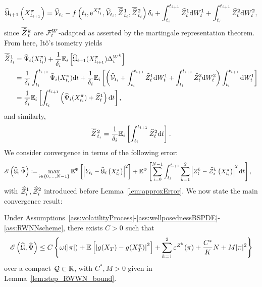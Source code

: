 \begin{equation}\label{eq:martingaleRep}
    \widehat{\mathfrak{U}}_{i+1}\left(X^\pi_{t_{i+1}}\right)=\widehat{\mathcal{V}}_{t_{i}}-f\left(t_{i},\mathrm{e}^{X^\pi_{t_{i}}}, \widehat{\mathcal{V}}_{t_{i}}, \overline{\widehat{Z}}\kern0.1em^{1}_{t_{i}}, \overline{\widehat{Z}}\kern0.1em^{2}_{t_{i}}\right) \delta_{i} +\int_{t_{i}}^{t_{i+1}}{\widehat{Z}}_{t}^1\mathrm{d} W^1_{t}+\int_{t_{i}}^{t_{i+1}} {\widehat{Z}}_{t}^2 \mathrm{d} W^2_{t},
\end{equation}
since $\overline{\widehat{Z}}\kern0.1em^{k}_{t}$ are $\mathcal{F}_t^W$-adapted as asserted by the martingale representation theorem. 
From here, It\^o's isometry yields
\begin{align*}
    \overline{\widehat{Z}}\kern0.1em^{1}_{t_{i}} &= \widehat\Psi_i(X^\pi_{t_i}) +  \frac1{\delta_{i}}\mathbb{E}_i\left[\widehat{\mathfrak{U}}_{i+1}(X^\pi_{t_{i+1}})\Delta^{W^k}_{i} \right] \\
    &= \frac1{\delta_{i}}\int_{t_i}^{t_{i+1}}\widehat\Psi_i(X^\pi_{t_i})\mathrm{d} t +  \frac1{\delta_{i}}\mathbb{E}_i\left[\left(\widehat{\mathcal{V}}_{t_i} +\int_{t_{i}}^{t_{i+1}} \widehat{Z}_{t}^1 \mathrm{d} W^1_{t}+\int_{t_{i}}^{t_{i+1}} \widehat{Z}_{t}^2 \mathrm{d} W^2_{t} \right)\int_{t_i}^{t_{i+1}} \mathrm{d} W^1_t \right]  \\
    &= \frac1{\delta_{i}}\mathbb{E}_i\left[\int_{t_i}^{t_{i+1}}\left( \widehat\Psi_i(X^\pi_{t_i}) + \widehat{Z}_{t}^1 \right)\mathrm{d} t \right],
\end{align*}
and similarly, 
$$
\overline{\widehat{Z}}\kern0.1em^{2}_{t_{i}} = \frac1{\delta_{i}}\mathbb{E}_i\left[\int_{t_i}^{t_{i+1}} \widehat{Z}_{t}^2 \mathrm{d} t \right].
$$
We consider convergence in terms of the following error:
\[
\begin{aligned}
\mathscr{E}\left(\widehat{\mathfrak{U}}, \widehat\Psi\right) \coloneqq &\max _{i\in\{0, \dots, N-1\}} \mathbb{E}^\Phi\left[\left|Y_{t_i}-\widehat{\mathfrak{U}}_i\left(X^\pi_{t_i}\right)\right|^2\right]+\mathbb{E}^\Phi\left[\sum_{i=0}^{N-1} \int_{t_i}^{t_{i+1}}\sum_{k=1}^2\left|Z_t^k-\widehat{\mathcal{Z}}^k_i\left(X^\pi_{t_i}\right)\right|^2 \mathrm{d} t\right],
\end{aligned}
\]
with $\widehat{\mathcal{Z}}^1_{i}, \widehat{\mathcal{Z}}^2_{i}$
introduced before Lemma~\ref{lem:approxError}. 
We now state the main convergence result:
\begin{theorem}\label{thm:convergence}
Under Assumptions~\ref{ass:volatilityProcess}-\ref{ass:wellposednessBSPDE}-\ref{ass:RWNNscheme},
there exists $C>0$ such that
\[
\mathscr{E}\left(\widehat{\mathfrak{U}}, \widehat\Psi\right) \leq C\left\{\omega(|\pi|) + \mathbb{E}\left[\left|g(X_T)-g(X^{\pi}_{T})\right|^2\right]+\sum_{k=1}^2\varepsilon^{Z^k}(\pi)+\frac{C^{*}}{K}N+ M|\pi|^2\right\}  
\]
over a compact $\mathcal{Q}\subset \mathbb{R}$, with $C^*, M>0$ given in Lemma~\ref{lem:step_RWWN_bound}.
\end{theorem}

